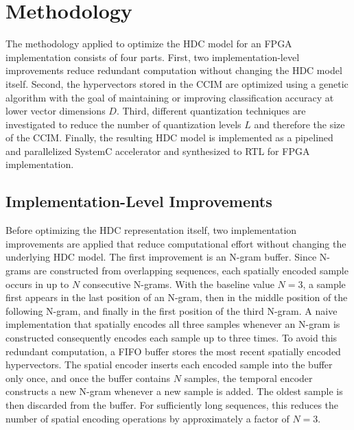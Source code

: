 \chapter{Methodology}
\label{sec:methodology}
The methodology applied to optimize the HDC model for an FPGA implementation consists of four parts. First, two implementation-level improvements reduce redundant computation without changing the HDC model itself. Second, the hypervectors stored in the CCIM are optimized using a genetic algorithm with the goal of maintaining or improving classification accuracy at lower vector dimensions $D$. Third, different quantization techniques are investigated to reduce the number of quantization levels $L$ and therefore the size of the CCIM. Finally, the resulting HDC model is implemented as a pipelined and parallelized SystemC accelerator and synthesized to \ac{RTL} for FPGA implementation. 

\section{Implementation-Level Improvements}
\label{sec:implementation_improvements}
Before optimizing the HDC representation itself, two implementation improvements are applied that reduce computational effort without changing the underlying HDC model. 
\enlargethispage{\baselineskip}
The first improvement is an N-gram buffer. Since N-grams are constructed from overlapping sequences, each spatially encoded sample occurs in up to $N$ consecutive N-grams. With the baseline value $N = 3$, a sample first appears in the last position of an N-gram, then in the middle position of the following N-gram, and finally in the first position of the third N-gram. A naive implementation that spatially encodes all three samples whenever an N-gram is constructed consequently encodes each sample up to three times. To avoid this redundant computation, a FIFO buffer stores the most recent spatially encoded hypervectors. The spatial encoder inserts each encoded sample into the buffer only once, and once the buffer contains $N$ samples, the temporal encoder constructs a new N-gram whenever a new sample is added. The oldest sample is then discarded from the buffer. For sufficiently long sequences, this reduces the number of spatial encoding operations by approximately a factor of $N=3$. \\

